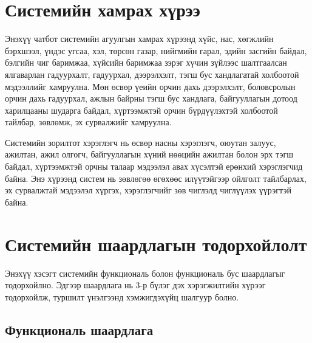 \section{Системийн хамрах хүрээ}

Энэхүү чатбот системийн агуулгын хамрах хүрээнд хүйс, нас, хөгжлийн бэрхшээл, үндэс угсаа, хэл, төрсөн газар, нийгмийн гарал, эдийн засгийн байдал, бэлгийн чиг баримжаа, хүйсийн баримжаа зэрэг хүчин зүйлээс шалтгаалсан ялгаварлан гадуурхалт, гадуурхал, дээрэлхэлт, тэгш бус хандлагатай холбоотой мэдээллийг хамруулна. Мөн өсвөр үеийн орчин дахь дээрэлхэлт, боловсролын орчин дахь гадуурхал, ажлын байрны тэгш бус хандлага, байгууллагын дотоод харилцааны шударга байдал, хүртээмжтэй орчин бүрдүүлэхтэй холбоотой тайлбар, зөвлөмж, эх сурвалжийг хамруулна.

Системийн зорилтот хэрэглэгч нь өсвөр насны хэрэглэгч, оюутан залуус, ажилтан, ажил олгогч, байгууллагын хүний нөөцийн ажилтан болон эрх тэгш байдал, хүртээмжтэй орчны талаар мэдээлэл авах хүсэлтэй ерөнхий хэрэглэгчид байна. Энэ хүрээнд систем нь зөвлөгөө өгөхөөс илүүтэйгээр ойлголт тайлбарлах, эх сурвалжтай мэдээлэл хүргэх, хэрэглэгчийг зөв чиглэлд чиглүүлэх үүрэгтэй байна.







\section{Системийн шаардлагын тодорхойлолт}

Энэхүү хэсэгт системийн функциональ болон функциональ бус шаардлагыг тодорхойлно. Эдгээр шаардлага нь 3-р бүлэг дэх хэрэгжилтийн хүрээг тодорхойлж, туршилт үнэлгээнд хэмжигдэхүйц шалгуур болно.

\subsection{Функциональ шаардлага}

